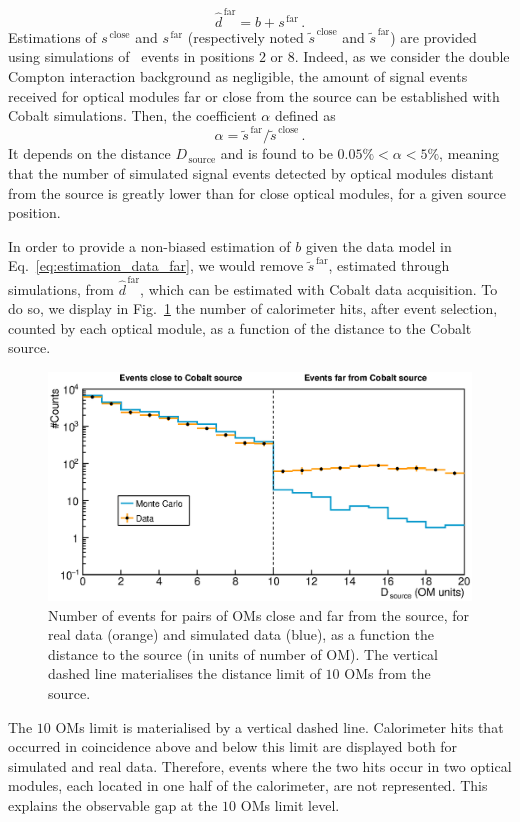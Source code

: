 \begin{equation}
  \hat{d}^{\,\text{far}} = b + s^{\,\text{far}}\,.
  \label{eq:estimation_data_far}
\end{equation}
Estimations of $s^{\,\text{close}}$ and $s^{\,\text{far}}$ (respectively noted $\tilde{s}^{\,\text{close}}$ and $\tilde{s}^{\,\text{far}}$) are provided using simulations of \Co\ events in positions $2$ or $8$.
Indeed, as we consider the double Compton interaction background as negligible, the amount of signal events received for optical modules far or close from the source can be established with Cobalt simulations.
Then, the coefficient $\alpha$ defined as
\begin{equation}
  \alpha = \tilde{s}^{\,\text{far}}/\tilde{s}^{\,\text{close}}\,.
\end{equation}
It depends on the distance $D_{\,\text{source}}$ and is found to be $0.05 \% < \alpha < 5 \%$, meaning that the number of simulated signal events detected by optical modules distant from the source is greatly lower than for close optical modules, for a given source position.

In order to provide a non-biased estimation of $b$ given the data model in Eq.~\eqref{eq:estimation_data_far}, we would remove $\tilde{s}^{\,\text{far}}$, estimated through simulations, from $\hat{d}^{\,\text{far}}$, which can be estimated with Cobalt data acquisition.
To do so, we display in Fig.~\ref{fig:Co_data_bkg} the number of calorimeter hits, after event selection, counted by each optical module, as a function of the distance to the Cobalt source.
\begin{figure}[h]
  \centering
  \includegraphics[width=1.1\textwidth]{commissioning/fig_commissioning/Co_data_bkg.eps}
  \caption{Number of events for pairs of OMs close and far from the source, for real data (orange) and simulated data (blue), as a function the distance to the source (in units of number of OM).
    The vertical dashed line materialises the distance limit of $10$ OMs from the source.
    \label{fig:Co_data_bkg}}
\end{figure}
The $10$ OMs limit is materialised by a vertical dashed line.
Calorimeter hits that occurred in coincidence above and below this limit are displayed both for simulated and real data.
Therefore, events where the two hits occur in two optical modules, each located in one half of the calorimeter, are not represented.
This explains the observable gap at the $10$ OMs limit level.

